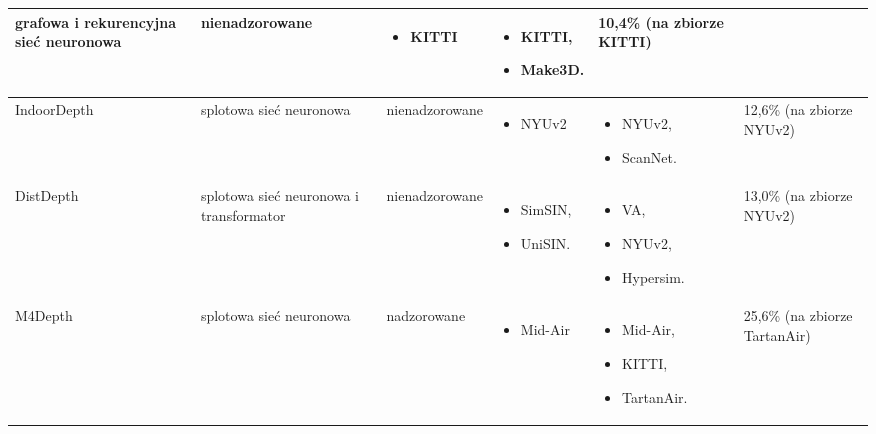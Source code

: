 \begin{table}[H]
{\begin{tabular}{ |l|p{2cm}|p{3cm}|p{5cm}|p{5cm}|p{2cm}| }
        grafowa i rekurencyjna sieć neuronowa &
        nienadzorowane &
        \begin{itemize}
            \item KITTI
        \end{itemize} & 
        \begin{itemize}
            \item KITTI,
            \item Make3D.
        \end{itemize} &
        10,4\% (na zbiorze KITTI)\\
        \hline
        IndoorDepth \cite{fan2023deeper} &
        splotowa sieć neuronowa &
        nienadzorowane &
        \begin{itemize}
            \item NYUv2
        \end{itemize} & 
        \begin{itemize}
            \item NYUv2,
            \item ScanNet.
        \end{itemize} & 
        12,6\% (na zbiorze NYUv2)\\
        \hline
        DistDepth \cite{wu2022practical} &
        splotowa sieć neuronowa i transformator &
        nienadzorowane &
        \begin{itemize}
            \item SimSIN,
            \item UniSIN.
        \end{itemize} & 
        \begin{itemize}
            \item VA,
            \item NYUv2,
            \item Hypersim.
        \end{itemize} &
        13,0\% (na zbiorze NYUv2)\\
        \hline
        M4Depth \cite{fonder2023technique} &
        splotowa sieć neuronowa &
        nadzorowane &
        \begin{itemize}
            \item Mid-Air
        \end{itemize} & 
        \begin{itemize}
            \item Mid-Air,
            \item KITTI,
            \item TartanAir.
        \end{itemize} &
        25,6\% (na zbiorze TartanAir)\\
        \hline
        \end{tabular}%
    }
    \label{tabela_podsumowanie_algorytmy_2}
\end{table}

